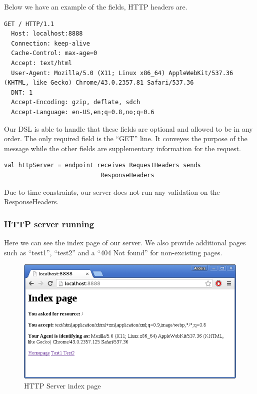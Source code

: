 Below we have an example of the fields, HTTP headers are.
\begin{lstlisting}[style=myScalastyle]
  GET / HTTP/1.1
  Host: localhost:8888
  Connection: keep-alive
  Cache-Control: max-age=0
  Accept: text/html
  User-Agent: Mozilla/5.0 (X11; Linux x86_64) AppleWebKit/537.36 (KHTML, like Gecko) Chrome/43.0.2357.81 Safari/537.36
  DNT: 1
  Accept-Encoding: gzip, deflate, sdch
  Accept-Language: en-US,en;q=0.8,no;q=0.6
\end{lstlisting}
Our DSL is able to handle that these fields are optional and allowed to be in any order. The only required field is the ``GET'' line. It conveyes the purpose of the message while the other fields are supplementary information for the request.
\begin{lstlisting}[style=myScalastyle]
val httpServer = endpoint receives RequestHeaders sends 
                           ResponseHeaders 
\end{lstlisting}
Due to time constraints, our server does not run any validation on the ResponseHeaders.
\subsubsection{HTTP server running}
Here we can see the index page of our server. We also provide additional pages such as ``test1'', ``test2'' and a ``404 Not found'' for non-excisting pages. 
\begin{figure}[h]
	\centering
	\includegraphics[scale=0.7]{images/protocolimplementations/httpserver.png} 
	\caption{HTTP Server index page}
	\label{fig:httpserver}
\end{figure}











